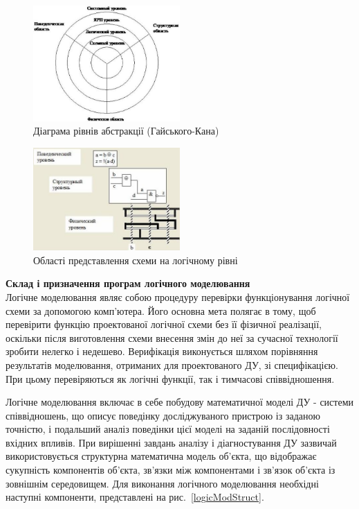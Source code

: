 \documentclass[12pt,a4paper]{article}
\begin{document}
\begin{figure}[h]
  \centering
    \includegraphics[width=0.5\textwidth]{01_01.jpg}
  \caption{Діаграма рівнів абстракції (Гайського-Кана)\label{abstrLvlDiag}}
\end{figure}

\begin{figure}[h]
  \centering
    \includegraphics[width=0.5\textwidth]{01_02.jpg}
  \caption{Області представлення схеми на логічному рівні\label{logicLvl}}
\end{figure}



\textbf{Склад і призначення програм логічного моделювання}\\
Логічне моделювання являє собою процедуру перевірки функціонування логічної схеми за допомогою комп'ютера. Його основна мета полягає в тому, щоб перевірити функцію проектованої логічної схеми без її фізичної реалізації, оскільки після виготовлення схеми внесення змін до неї за сучасної технології зробити нелегко і недешево. Верифікація виконується шляхом порівняння результатів моделювання, отриманих для проектованого ДУ, зі специфікацією. При цьому перевіряються як логічні функції, так і тимчасові співвідношення.

Логічне моделювання включає в себе побудову математичної моделі ДУ - системи співвідношень, що описує поведінку досліджуваного пристрою із заданою точністю, і подальший аналіз поведінки цієї моделі на заданій послідовності вхідних впливів. При вирішенні завдань аналізу і діагностування ДУ зазвичай використовується структурна математична модель об'єкта, що відображає сукупність компонентів об'єкта, зв'язки між компонентами і зв'язок об'єкта із зовнішнім середовищем. Для виконання логічного моделювання необхідні наступні компоненти, представлені на рис.~\ref{logicModStruct}.
\end{document}
